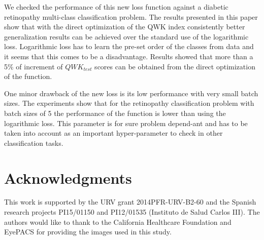 \documentclass[times,twocolumn,final,authoryear]{elsarticle}
\begin{document}
We checked the performance of this new loss function against a diabetic retinopathy multi-class classification problem. The results presented in this paper show that with the direct optimization of the QWK index consistently better generalization results can be achieved over the standard use of the logarithmic loss. Logarithmic loss has to learn the pre-set order of the classes from data and it seems that this comes to be a disadvantage. Results showed that more than a 5\% of increment of $QWK_{test}$ scores can be obtained from the direct optimization of the function.

One minor drawback of the new loss is its low performance with very small batch sizes. The experiments show that for the retinopathy classification problem with batch sizes of 5 the performance of the function is lower than using the logarithmic loss. This parameter is for sure problem depend-ant and has to be taken into account as an important hyper-parameter to check in other classification tasks.


\section*{Acknowledgments}
This work is supported by the URV grant 2014PFR-URV-B2-60 and the Spanish research projects PI15/01150 and PI12/01535 (Instituto de Salud Carlos III). The authors would like to thank to the California Healthcare Foundation and EyePACS for providing the images used in this study.


%


\end{document}
